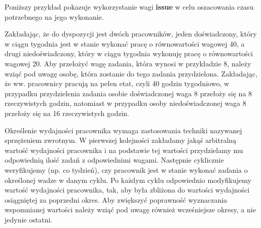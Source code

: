 Poniższy przykład pokazuje wykorzystanie wagi \textbf{issue} w celu oszacowania czasu potrzebnego na jego wykonanie.\par
Zakładając, że do dyspozycji jest dwóch pracowników, jeden doświadczony, który w ciągu tygodnia jest w stanie wykonać pracę o równowartości wagowej 40, a drugi niedoświadczony, który w ciągu tygodnia wykonuję pracę o równowartości wagowej 20. Aby przełożyć wagę zadania, która wynosi w przykładzie 8, należy wziąć pod uwagę osobę, która zostanie do tego zadania przydzielona. Zakładając, że ww. pracownicy pracują na pełen etat, czyli 40 godzin tygodniowo, w przypadku przydzielenia zadania osobie doświadczonej waga 8 przełoży się na 8 rzeczywistych godzin, natomiast w przypadku osoby niedoświadczonej waga 8 przełoży się na 16 rzeczywistych godzin. \par

Określenie wydajności pracownika wymaga zastosowania techniki nazywanej sprzężeniem zwrotnym. W pierwszej kolejności zakładamy jakąś arbitralną wartość wydajności pracownika i na podstawie tej wartości przydzielamy mu odpowiednią ilość zadań z odpowiednimi wagami. Następnie cyklicznie weryfikujemy (np. co tydzień), czy pracownik jest w stanie wykonać zadania o określonej wadze w danym cyklu. Po każdym cyklu odpowiednio modyfikujemy wartość wydajności pracownika, tak, aby była zbliżona do wartości wydajności osiągniętej za poprzedni okres. Aby zwiększyć poprawność wyznaczania wspomnianej wartości należy wziąć pod uwagę również wcześniejsze okresy, a nie jedynie ostatni.\par

\newpage

